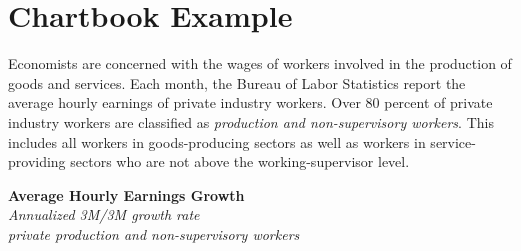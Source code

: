 \documentclass{report}
\newcommand{\dateaxisticks}{
		date coordinates in=x, axis line style={draw=none},
		xmin={2017-01-01}, xmax={2025-04-15}, 
		xtick={{2017-01-01}, {2018-01-01}, {2019-01-01}, {2020-01-01}, {2021-01-01}, 
			{2022-01-01}, {2023-01-01}, {2024-01-01}, 
		    {2025-01-01}},
		}
\newcommand{\rbar}{
		\fill[color=black!10] (axis cs:{2020-02-01},\pgfkeysvalueof{/pgfplots/ymin}) 
			rectangle (axis cs:{2020-05-01}, \pgfkeysvalueof{/pgfplots/ymax});}
\begin{document}
 

\section*{Chartbook Example}

Economists are concerned with the wages of workers involved in the production of goods and services. Each month, the Bureau of Labor Statistics report the average hourly earnings of private industry workers. Over 80 percent of private industry workers are classified as \textit{production and non-supervisory workers}. This includes all workers in goods-producing sectors as well as workers in service-providing sectors who are not above the working-supervisor level. \\


\vspace{3mm}

\noindent \textbf{Average Hourly Earnings Growth}\\
\small \textit{Annualized 3M/3M growth rate}\\
\textit{private production and non-supervisory workers}\\
\end{document}
